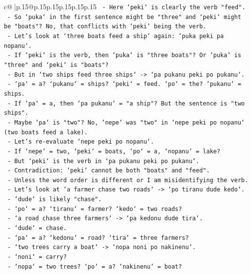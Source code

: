 \documentclass{article}
\begin{document}
{\begin{supertabular}{c@{$\;$}|p{.15\linewidth}@{}p{.15\linewidth}p{.15\linewidth}p{.15\linewidth}p{.15\linewidth}p{.15\linewidth}}
{{{\texttt{    {-} Here `peki` is clearly the verb "feed".} \\
\texttt{    {-} So `puka` in the first sentence might be "three" and `peki` might be "boats"? No, that conflicts with `peki` being the verb.} \\
\texttt{    {-} Let's look at `three boats feed a ship` again: `puka peki pa nopanu`.} \\
\texttt{    {-} If `peki` is the verb, then `puka` is "three boats"? Or `puka` is "three" and `peki` is "boats"?} \\
\texttt{    {-} But in `two ships feed three ships` {-}> `pa pukanu peki po pukanu`.} \\
\texttt{      {-} `pa` = a? `pukanu` = ships? `peki` = feed. `po` = the? `pukanu` = ships.} \\
\texttt{      {-} If `pa` = a, then `pa pukanu` = "a ship"? But the sentence is "two ships".} \\
\texttt{      {-} Maybe `pa` is "two"? No, `nepe` was "two" in `nepe peki po nopanu` (two boats feed a lake).} \\
\texttt{      {-} Let's re{-}evaluate `nepe peki po nopanu`.} \\
\texttt{        {-} If `nepe` = two, `peki` = boats, `po` = a, `nopanu` = lake?} \\
\texttt{        {-} But `peki` is the verb in `pa pukanu peki po pukanu`.} \\
\texttt{        {-} Contradiction: `peki` cannot be both "boats" and "feed".} \\
\texttt{        {-} Unless the word order is different or I am misidentifying the verb.} \\
\texttt{        {-} Let's look at `a farmer chase two roads` {-}> `po tiranu dude kedo`.} \\
\texttt{          {-} `dude` is likely "chase".} \\
\texttt{          {-} `po` = a? `tiranu` = farmer? `kedo` = two roads?} \\
\texttt{        {-} `a road chase three farmers` {-}> `pa kedonu dude tira`.} \\
\texttt{          {-} `dude` = chase.} \\
\texttt{          {-} `pa` = a? `kedonu` = road? `tira` = three farmers?} \\
\texttt{        {-} `two trees carry a boat` {-}> `nopa noni po nakinenu`.} \\
\texttt{          {-} `noni` = carry?} \\
\texttt{          {-} `nopa` = two trees? `po` = a? `nakinenu` = boat?} \\
}}}
\end{supertabular}}
\end{document}
